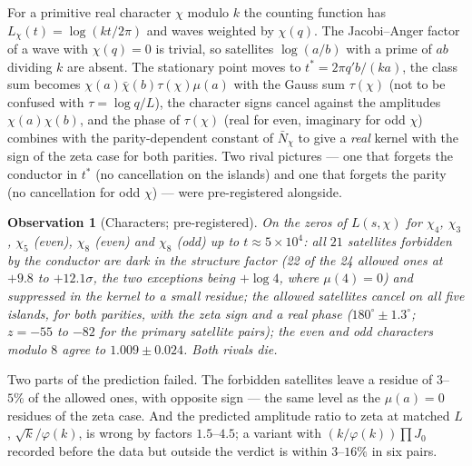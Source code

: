 \documentclass[12pt]{amsart}
\newtheorem{observation}{Observation}
\begin{document}
For a primitive real character $\chi$ modulo $k$ the counting function has
$L_\chi(t) = \log(kt/2\pi)$ and waves weighted by $\chi(q)$. The
Jacobi--Anger factor of a wave with $\chi(q) = 0$ is trivial, so
satellites $\log(a/b)$ with a prime of $ab$ dividing $k$ are absent. The
stationary point moves to $t^* = 2\pi q'b/(ka)$, the class sum becomes
$\chi(a)\bar\chi(b)\tau(\chi)\mu(a)$ with the Gauss sum $\tau(\chi)$ (not to be confused with
$\tau = \log q/L$), the
character signs cancel against the amplitudes $\chi(a)\chi(b)$, and the
phase of $\tau(\chi)$ (real for even, imaginary for odd $\chi$) combines
with the parity-dependent constant of $\bar N_\chi$ to give a
\emph{real} kernel with the sign of the zeta case for both parities. Two
rival pictures --- one that forgets the conductor in $t^*$ (no
cancellation on the islands) and one that forgets the parity (no
cancellation for odd $\chi$) --- were pre-registered alongside.

\begin{observation}[Characters; pre-registered]
On the zeros of $L(s,\chi)$ for $\chi_4$, $\chi_3$, $\chi_5$ (even),
$\chi_8$ (even) and $\chi_8$ (odd) up to $t \approx 5\times10^4$: all
$21$ satellites forbidden by the conductor are dark in the structure
factor (22 of the 24 allowed ones at $+9.8$ to $+12.1\sigma$, the two
exceptions being $+\log 4$, where $\mu(4) = 0$) and suppressed in the
kernel to a small residue; the
allowed satellites cancel on all five islands, for both parities, with
the zeta sign and a real phase ($180^\circ\pm1.3^\circ$; $z = -55$ to $-82$
for the primary satellite pairs); the even and odd characters modulo $8$ agree to $1.009\pm0.024$.
Both rivals die.
\end{observation}

Two parts of the prediction failed. The forbidden satellites leave a
residue of $3$--$5\%$ of the allowed ones, with opposite sign --- the same
level as the $\mu(a) = 0$ residues of the zeta case. And the predicted
amplitude ratio to zeta at matched $L$, $\sqrt{k}/\varphi(k)$, is wrong by
factors $1.5$--$4.5$; a variant with $(k/\varphi(k))\prod J_0$ recorded
before the data but outside the verdict is within $3$--$16\%$ in six pairs.
\end{document}
